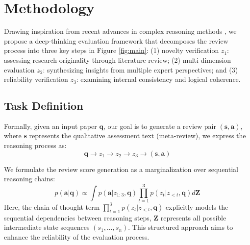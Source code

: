 \documentclass{article}
\begin{document}


\section{Methodology}%

Drawing inspiration from recent advances in complex reasoning methods \citep{xiang20252reasoningllmslearning,hao2024traininglargelanguagemodels}, we propose a deep-thinking evaluation framework that decomposes the review process into three key steps in Figure \ref{fig:main}: (1) novelty verification $z_1$: assessing research originality through literature review; (2) multi-dimension evaluation $z_2$: synthesizing insights from multiple expert perspectives; and (3) reliability verification $z_3$: examining internal consistency and logical coherence.

\subsection{Task Definition}

Formally, given an input paper $\mathbf{q}$, our goal is to generate a review pair $(\mathbf{s}, \mathbf{a})$, where $\mathbf{s}$ represents the qualitative assessment text (meta-review), we express the reasoning process as:
\begin{equation*}
\mathbf{q} \rightarrow z_1 \rightarrow z_2 \rightarrow z_3 \rightarrow (\mathbf{s}, \mathbf{a})
\end{equation*}

We formulate the review score generation as a marginalization over sequential reasoning chains:
\begin{equation}
p(\mathbf{a}|\mathbf{q}) \propto \int p(\mathbf{a}|z_{1:3}, \mathbf{q}) \prod_{t=1}^{3} p(z_t | z_{<t}, \mathbf{q})d\mathbf{Z}
\end{equation}
Here, the chain-of-thought term $\prod_{t=1}^{3} p(z_t | z_{<t}, \mathbf{q})$ explicitly models the sequential dependencies between reasoning steps, $\mathbf{Z}$ represents all possible intermediate state sequences $(s_1,\dots,s_n)$. This structured approach aims to enhance the reliability of the evaluation process. 
\end{document}

